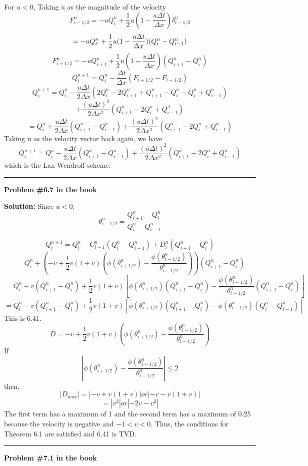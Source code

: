 \documentclass[11pt]{article}
\begin{document}
For $u<0$,
Taking u as the magnitude of the velocity
\[F_{i-1/2}^n= -uQ_{i}^n + \frac{1}{2}u(1-\frac{u\Delta t}{\Delta x})\delta_{i-1/2}^n\]
\[= -uQ_{i`	}^n + \frac{1}{2}u(1-\frac{u\Delta t}{\Delta x})(Q_i^n-Q_{i-1}^n)\]
\[F_{i+1/2}^n= -uQ_{i+1}^n + \frac{1}{2}u(1-\frac{u\Delta t}{\Delta x})(Q_{i+1}^n-Q_{i}^n)\]
\[ Q_i^{n+1}= Q_i^{n} - \frac{\Delta t}{\Delta x} (F_{i+1/2} -F_{i-1/2} )\]
\[ Q_i^{n+1}= Q_i^{n} - \frac{u\Delta t}{2\Delta x} (2Q_i^{n} -2Q_{i+1}^{n} + Q_{i+1}^n-Q_{i}^n -Q_i^n+Q_{i-1}^n)\]
\[+\frac{(u\Delta t)^2}{2\Delta x^2}(Q_{i+1}^n-2Q_{i}^n+Q_{i-1}^n)\]
\[= Q_i^{n} + \frac{u\Delta t}{2\Delta x} ( Q_{i+1}^n-Q_{i-1}^n)+\frac{(u\Delta t)^2}{2\Delta x^2}(Q_{i+1}^n-2Q_{i}^n+Q_{i-1}^n)\]
Taking u as the velocity vector back again, we have 
\[Q_i^{n+1}= Q_i^{n} - \frac{u\Delta t}{2\Delta x} ( Q_{i+1}^n-Q_{i-1}^n)+\frac{(u\Delta t)^2}{2\Delta x^2}(Q_{i+1}^n-2Q_{i}^n+Q_{i-1}^n)\]
which is the Lax-Wendroff scheme. 

\vskip 1cm
\hrule
{\bf Problem \#6.7 in the book}

\vskip 1cm
{\bf Solution:}
Since $u<0$, 
\[ \theta_{i-1/2}^n = \frac{Q_{i+1}^n-Q_{i}^n}{Q_{i}^n-Q_{i-1}^n} \]

\[Q_i^{n+1}= Q_i^{n} -C_{i-1}^n(Q_i^n-Q_{i-1}^n)+D_i^n(Q_{i+1}^n-Q_{i}^n)\]
\[= Q_i^{n}+(-v +\frac{1}{2} v(1+v)(\phi(\theta_{i+1/2}^n)-\frac{\phi(\theta_{i-1/2}^n)}{\theta_{i-1/2}^n} ))(Q_{i+1}^n-Q_{i}^n)\]
\[= Q_i^{n}-v(Q_{i+1}^n-Q_{i}^n) +\frac{1}{2} v(1+v)[\phi(\theta_{i+1/2}^n)(Q_{i+1}^n-Q_{i}^n)-\frac{\phi(\theta_{i-1/2}^n)}{\theta_{i-1/2}^n}(Q_{i+1}^n-Q_{i}^n) ]\]
\[= Q_i^{n}-v(Q_{i+1}^n-Q_{i}^n) +\frac{1}{2} v(1+v)[\phi(\theta_{i+1/2}^n)(Q_{i+1}^n-Q_{i}^n)-\phi(\theta_{i-1/2}^n)(Q_{i}^n-Q_{i-1}^n) ]\]
 This is 6.41.
\[  D= -v +\frac{1}{2} v(1+v)(\phi(\theta_{i+1/2}^n)-\frac{\phi(\theta_{i-1/2}^n)}{\theta_{i-1/2}^n} ) \]
If \[|\phi(\theta_{i+1/2}^n)-\frac{\phi(\theta_{i-1/2}^n)}{\theta_{i-1/2}^n} |\leq 2\] then,
\[|D_{max}|= |-v+v(1+v)| or |-v-v(1+v) | \]
\[= |v^2| or |-2v-v^2 | \]
The first term has a maximum of 1 and the second term has a maximum of 0.25 because the velocity is negative and $-1<v<0$.
Thus, the conditions for Theorem 6.1 are satisfied and 6.41 is TVD.





\vskip 1cm
\hrule
{\bf Problem \#7.1 in the book}
\end{document}
